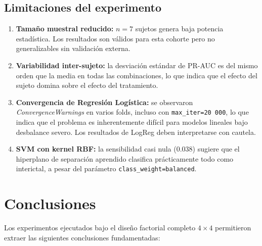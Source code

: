 \documentclass[12pt,a4paper]{article}
\begin{document}
\subsection{Limitaciones del experimento}

\begin{enumerate}
\item \textbf{Tamaño muestral reducido:} $n=7$ sujetos genera baja potencia estadística.
  Los resultados son válidos para esta cohorte pero no generalizables sin validación externa.
\item \textbf{Variabilidad inter-sujeto:} la desviación estándar de PR-AUC es del mismo
  orden que la media en todas las combinaciones, lo que indica que el efecto del sujeto
  domina sobre el efecto del tratamiento.
\item \textbf{Convergencia de Regresión Logística:} se observaron
  \textit{ConvergenceWarnings} en varios folds, incluso con \texttt{max\_iter=20\,000},
  lo que indica que el problema es inherentemente difícil para modelos lineales bajo
  desbalance severo. Los resultados de LogReg deben interpretarse con cautela.
\item \textbf{SVM con kernel RBF:} la sensibilidad casi nula (0.038) sugiere que el
  hiperplano de separación aprendido clasifica prácticamente todo como interictal,
  a pesar del parámetro \texttt{class\_weight=balanced}.
\end{enumerate}

\section{Conclusiones}

Los experimentos ejecutados bajo el diseño factorial completo $4 \times 4$ permitieron
extraer las siguientes conclusiones fundamentadas:
\end{document}
